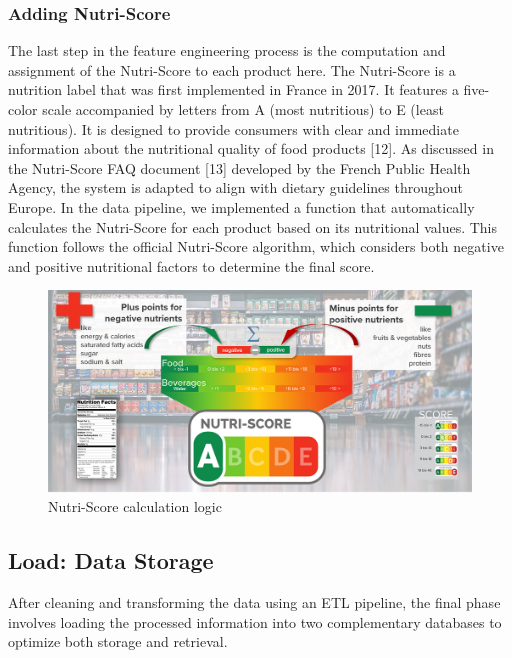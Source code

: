  \subsubsection{Adding Nutri-Score}
The last step in the feature engineering process is the computation and assignment of the
Nutri-Score to each product here. The Nutri-Score is a nutrition label that was first implemented in France
in 2017. It features a five-color scale accompanied by letters from A (most
nutritious) to E (least nutritious). It is designed to provide consumers
with clear and immediate information about the nutritional quality of
food products [12]. As discussed in the Nutri-Score FAQ document [13]
developed by the French Public Health Agency, the system is adapted to
align with dietary guidelines throughout Europe. In the data pipeline,
we implemented a function that automatically calculates the Nutri-Score
for each product based on its nutritional values. This function follows
the official Nutri-Score algorithm, which considers both negative and
positive nutritional factors to determine the final score.



\begin{center}
\begin{figure}[H]
    \includegraphics[scale=0.90]{images/nutriscore.jpg}
    \caption{Nutri-Score calculation logic} 
    \label{fig: add_nutriscore}
\end{figure}
\end{center}

\subsection{Load: Data Storage}
After cleaning and transforming the data using an ETL pipeline, the final
phase involves loading the processed information into two complementary
databases to optimize both storage and retrieval.

